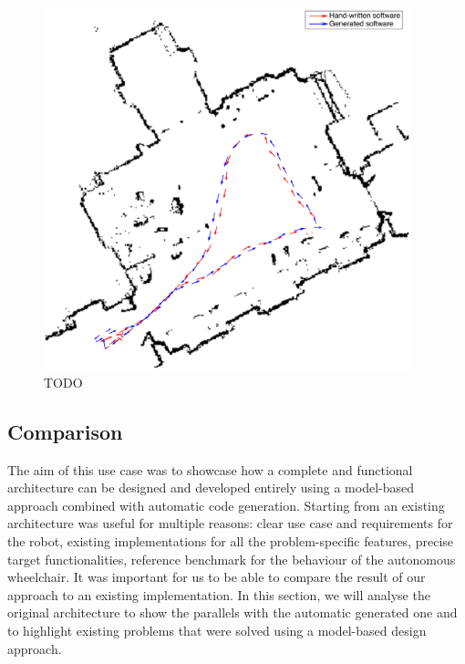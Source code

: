 \begin{figure}[t]
\centering
\includegraphics[width=0.95\textwidth]{gfx/pmk/path-followed}
\caption{TODO}
\label{fig:path}
\end{figure}

\subsection{Comparison}
The aim of this use case was to showcase how a complete and functional architecture can be designed and developed entirely using a model-based approach combined with automatic code generation. Starting from an existing architecture was useful for multiple reasons: clear use case and requirements for the robot, existing implementations for all the problem-specific features, precise target functionalities, reference benchmark for the behaviour of the autonomous wheelchair. It was important for us to be able to compare the result of our approach to an existing implementation. In this section, we will analyse the original architecture to show the parallels with the automatic generated one and to highlight existing problems that were solved using a model-based design approach.

